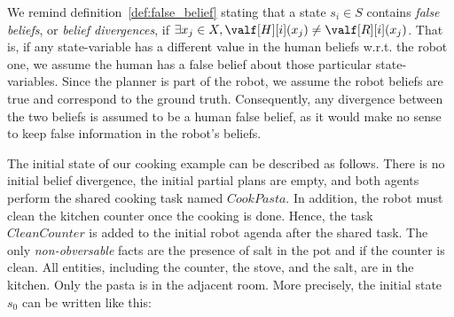 We remind definition~\ref{def:false_belief} stating that a state $s_i \in S$ contains \textit{false beliefs}, or \textit{belief divergences}, if $\exists x_j \in X, \valf[H][i](x_j) \neq \valf[R][i](x_j)$. That is, if any state-variable has a different value in the human beliefs w.r.t. the robot one, we assume the human has a false belief about those particular state-variables. Since the planner is part of the robot, we assume the robot beliefs are true and correspond to the ground truth. Consequently, any divergence between the two beliefs is assumed to be a human false belief, as it would make no sense to keep false information in the robot's beliefs. 

The initial state of our cooking example can be described as follows. There is no initial belief divergence, the initial partial plans are empty, and both agents perform the shared cooking task named $CookPasta$. In addition, the robot must clean the kitchen counter once the cooking is done. Hence, the task $CleanCounter$ is added to the initial robot agenda after the shared task. The only \textit{non-obversable} facts are the presence of salt in the pot and if the counter is clean. All entities, including the counter, the stove, and the salt, are in the kitchen. Only the pasta is in the adjacent room. More precisely, the initial state $s_0$ can be written like this: 


